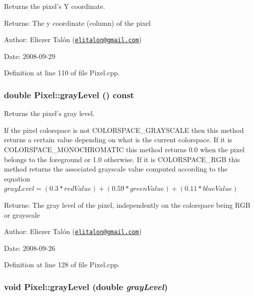 Returns the pixel's Y coordinate. 

\begin{Desc}
\item[Returns:]The y coordinate (column) of the pixel\end{Desc}
\begin{Desc}
\item[Author:]Eliezer Talón (\href{mailto:elitalon@gmail.com}{\tt elitalon@gmail.com}) \end{Desc}
\begin{Desc}
\item[Date:]2008-09-29 \end{Desc}


Definition at line 110 of file Pixel.cpp.\hypertarget{class_pixel_6e445cee8bfa4475238823e0b6da42b0}{
\subsubsection[grayLevel]{\setlength{\rightskip}{0pt plus 5cm}double Pixel::grayLevel () const}}
\label{class_pixel_6e445cee8bfa4475238823e0b6da42b0}


Returns the pixel's gray level. 

If the pixel colorspace is not COLORSPACE\_\-GRAYSCALE then this method returns a certain value depending on what is the current colorspace. If it is COLORSPACE\_\-MONOCHROMATIC this method returns 0.0 when the pixel belongs to the foreground or 1.0 otherwise. If it is COLORSPACE\_\-RGB this method returns the associated grayscale value computed according to the equation $grayLevel = (0.3 * redValue) + (0.59 * greenValue) + (0.11 * blueValue)$

\begin{Desc}
\item[Returns:]The gray level of the pixel, independently on the colorspace being RGB or grayscale\end{Desc}
\begin{Desc}
\item[Author:]Eliezer Talón (\href{mailto:elitalon@gmail.com}{\tt elitalon@gmail.com}) \end{Desc}
\begin{Desc}
\item[Date:]2008-09-26 \end{Desc}


Definition at line 128 of file Pixel.cpp.\hypertarget{class_pixel_03f96954bfc27f8f8810e8c6e58828f8}{
\subsubsection[grayLevel]{\setlength{\rightskip}{0pt plus 5cm}void Pixel::grayLevel (double {\em grayLevel})}}
\label{class_pixel_03f96954bfc27f8f8810e8c6e58828f8}


